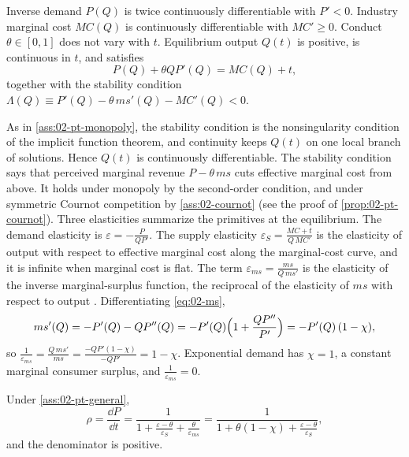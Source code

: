 \begin{assumption}\label{ass:02-pt-general}
Inverse demand $P(Q)$ is twice continuously differentiable with $P' < 0$. Industry marginal cost $MC(Q)$ is
continuously differentiable with $MC' \ge 0$. Conduct $\theta \in [0, 1]$ does not vary with $t$. Equilibrium
output $Q(t)$ is positive, is continuous in $t$, and satisfies
\begin{equation}\label{eq:02-pt-supply}
P(Q) + \theta QP'(Q) = MC(Q) + t ,
\end{equation}
together with the stability condition
$\Lambda(Q) \equiv P'(Q) - \theta\, ms'(Q) - MC'(Q) < 0$.
\end{assumption}

As in \cref{ass:02-pt-monopoly}, the stability condition is the nonsingularity condition of the implicit function
theorem, and continuity keeps $Q(t)$ on one local branch of solutions. Hence $Q(t)$ is continuously differentiable.
The stability condition says that perceived marginal revenue $P - \theta\, ms$ cuts effective marginal cost from
above. It holds under monopoly by the second-order condition, and under symmetric Cournot competition by
\cref{ass:02-cournot} (see the proof of \cref{prop:02-pt-cournot}). Three elasticities summarize the primitives at the equilibrium. The demand elasticity is
$\varepsilon = -\frac{P}{QP'}$. The supply elasticity $\varepsilon_S = \frac{MC + t}{Q\, MC'}$ is the elasticity
of output with respect to effective marginal cost along the marginal-cost curve, and it is infinite when marginal
cost is flat. The term $\varepsilon_{ms} = \frac{ms}{Q\, ms'}$ is the elasticity of the inverse marginal-surplus
function, the reciprocal of the elasticity of $ms$ with respect to output \citep[p.~539]{WeylFabinger2013}.
Differentiating \eqref{eq:02-ms},
\begin{equation*}
ms'(Q) = -P'(Q) - QP''(Q) = -P'(Q)\Bigl(1 + \frac{QP''}{P'}\Bigr) = -P'(Q)\,(1 - \chi) ,
\end{equation*}
so $\frac{1}{\varepsilon_{ms}} = \frac{Q\,ms'}{ms} = \frac{-QP'(1 - \chi)}{-QP'} = 1 - \chi$. Exponential demand has
$\chi = 1$, a constant marginal consumer surplus, and $\frac{1}{\varepsilon_{ms}} = 0$.

\begin{proposition}\label{prop:02-pt-general}
Under \cref{ass:02-pt-general},
\begin{equation}\label{eq:02-pt-general}
\rho = \frac{\dd P}{\dd t} = \frac{1}{1 + \frac{\varepsilon - \theta}{\varepsilon_S} + \frac{\theta}{\varepsilon_{ms}}}
= \frac{1}{1 + \theta(1 - \chi) + \frac{\varepsilon - \theta}{\varepsilon_S}} ,
\end{equation}
and the denominator is positive.
\end{proposition}

